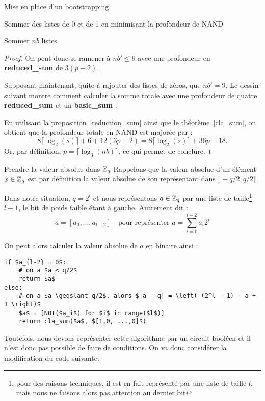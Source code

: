\begin{section}{Mise en place d'un bootstrapping}
\begin{subsection}{Sommer des listes de 0 et de 1 en minimisant la profondeur de NAND}
\begin{subsubsection}{Sommer $nb$ listes}
\begin{proof}
On peut donc se ramener à $nb' \leqslant 9$ avec une profondeur en \textbf{reduced\_sum} de $3(p - 2)$.

Supposant maintenant, quite à rajouter des listes de zéros, que  $nb' = 9$. Le dessin suivant montre comment calculer
la somme totale avec une profondeur de quatre \textbf{reduced\_sum} et un \textbf{basic\_sum} :

\begin{center}

\end{center}

En utilisant la proposition~\ref{reduction_sum} ainsi que le théorème~\ref{cla_sum}, on obtient que la profondeur totale en NAND est majorée par :
\[ 8 \lceil \log_2(s)\rceil + 6+ 12(3p - 2) = 8 \lceil \log_2(s) \rceil + 36p -18.\]
Or, par définition, $p = \lceil \log_3(nb) \rceil$, ce qui permet de conclure.
\end{proof}

\end{subsubsection}
\end{subsection}
\begin{subsection}{Prendre la valeur absolue dans $\mathbb{Z}_q$}
	Rappelons que la valeur absolue d'un élément $x\in \mathbb{Z}_q$ est par définition la valeur absolue de son représentant dans $\rrbracket -q/2, q/2\rrbracket$. 
	
	Dans notre situation, $q = 2^l$ et nous représentons $a\in \mathbb{Z}_q$ par une liste de taille\footnote{pour des raisons techniques, il est en fait représenté par une liste de taille $l$, mais nous ne faisons alors pas attention au dernier bit} $l-1$, le bit de poids faible étant à gauche. Autrement dit :
\[ a = [a_0, ..., a_{l-2}] \quad \text{pour représenter } a = \sum_{i=0}^{l-2} a_i 2^i\]

	On peut alors calculer la valeur absolue de $a$ en binaire ainsi :

\vspace{0.3cm}
\begin{lstlisting}
if $a_{l-2} = 0$: 
	# on a $a < q/2$
	return $a$
else:
	# on a $a \geqslant q/2$, alors $|a - q| = \left( (2^l - 1) - a + 1 \right)$
	$a$ = [NOT($a_i$) for $i$ in range($l$)]
	return cla_sum($a$, $[1,0, ...,0]$)
\end{lstlisting}
\vspace{0.3cm}

Toutefois, nous devons représenter cette algorithme par un circuit booléen et il n'est donc pas possible de faire de
conditions. On va donc considérer la modification du code suivante:


\end{subsection}
\end{section}
